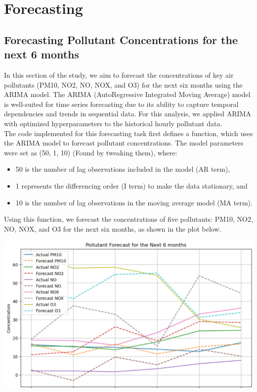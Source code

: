 \documentclass{modeleRapport}
\begin{document}
\section{Forecasting}

\subsection{Forecasting Pollutant Concentrations for the next 6 months}

In this section of the study, we aim to forecast the concentrations of key air pollutants (PM10, NO2, NO, NOX, and O3) 
for the next six months using the ARIMA model. The ARIMA (AutoRegressive Integrated Moving Average) model is well-suited 
for time series forecasting due to its ability to capture temporal dependencies and trends in sequential data. For 
this analysis, we applied ARIMA with optimized hyperparameters to the historical hourly pollutant data.\\

The code implemented for this forecasting task first defines a function, which uses the ARIMA model to 
forecast pollutant concentrations. The model parameters were set as (50, 1, 10) (Found by tweaking them), where:\\

\begin{itemize}
    \item 50 is the number of lag observations included in the model (AR term),
    \item 1 represents the differencing order (I term) to make the data stationary, and
    \item 10 is the number of lag observations in the moving average model (MA term).\\
\end{itemize}

Using this function, we forecast the concentrations of five pollutants: PM10, NO2, NO, NOX, and O3 for the next six months, 
as shown in the plot below.

\begin{center}
    \includegraphics[width=14cm]{Images/PollutantsForecast.png}
\end{center}
\end{document}

